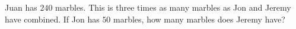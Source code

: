 Juan has $240$ marbles. This is three times as many marbles as Jon and Jeremy have combined. If Jon has $50$ marbles, how many marbles does Jeremy have?
